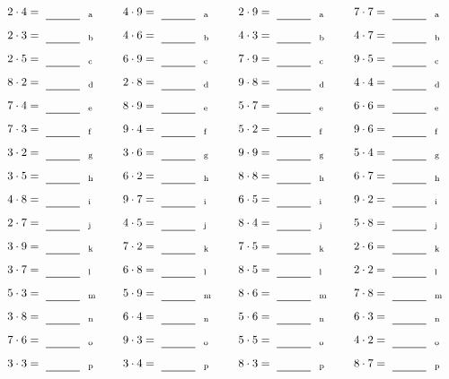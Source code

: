 \documentclass
[
  draft    = true,
  fontsize = 11pt,
  parskip  = half-
]
{scrartcl}
\begin{document}
\par\vfill\par
\begin{align*}
    \pline{2\cdot4}&=\rline{a}
  & \pline{4\cdot9}&=\rline{a}
  & \pline{2\cdot9}&=\rline{a}
  & \pline{7\cdot7}&=\rline{a} \\[1ex]
    \pline{2\cdot3}&=\rline{b}
  & \pline{4\cdot6}&=\rline{b}
  & \pline{4\cdot3}&=\rline{b}
  & \pline{4\cdot7}&=\rline{b} \\[1ex]
    \pline{2\cdot5}&=\rline{c}
  & \pline{6\cdot9}&=\rline{c}
  & \pline{7\cdot9}&=\rline{c}
  & \pline{9\cdot5}&=\rline{c} \\[1ex]
    \pline{8\cdot2}&=\rline{d}
  & \pline{2\cdot8}&=\rline{d}
  & \pline{9\cdot8}&=\rline{d}
  & \pline{4\cdot4}&=\rline{d} \\[1ex]
    \pline{7\cdot4}&=\rline{e}
  & \pline{8\cdot9}&=\rline{e}
  & \pline{5\cdot7}&=\rline{e}
  & \pline{6\cdot6}&=\rline{e} \\[1ex]
    \pline{7\cdot3}&=\rline{f}
  & \pline{9\cdot4}&=\rline{f}
  & \pline{5\cdot2}&=\rline{f}
  & \pline{9\cdot6}&=\rline{f} \\[1ex]
    \pline{3\cdot2}&=\rline{g}
  & \pline{3\cdot6}&=\rline{g}
  & \pline{9\cdot9}&=\rline{g}
  & \pline{5\cdot4}&=\rline{g} \\[1ex]
    \pline{3\cdot5}&=\rline{h}
  & \pline{6\cdot2}&=\rline{h}
  & \pline{8\cdot8}&=\rline{h}
  & \pline{6\cdot7}&=\rline{h} \\[1ex]
    \pline{4\cdot8}&=\rline{i}
  & \pline{9\cdot7}&=\rline{i}
  & \pline{6\cdot5}&=\rline{i}
  & \pline{9\cdot2}&=\rline{i} \\[1ex]
    \pline{2\cdot7}&=\rline{j}
  & \pline{4\cdot5}&=\rline{j}
  & \pline{8\cdot4}&=\rline{j}
  & \pline{5\cdot8}&=\rline{j} \\[1ex]
    \pline{3\cdot9}&=\rline{k}
  & \pline{7\cdot2}&=\rline{k}
  & \pline{7\cdot5}&=\rline{k}
  & \pline{2\cdot6}&=\rline{k} \\[1ex]
    \pline{3\cdot7}&=\rline{l}
  & \pline{6\cdot8}&=\rline{l}
  & \pline{8\cdot5}&=\rline{l}
  & \pline{2\cdot2}&=\rline{l} \\[1ex]
    \pline{5\cdot3}&=\rline{m}
  & \pline{5\cdot9}&=\rline{m}
  & \pline{8\cdot6}&=\rline{m}
  & \pline{7\cdot8}&=\rline{m} \\[1ex]
    \pline{3\cdot8}&=\rline{n}
  & \pline{6\cdot4}&=\rline{n}
  & \pline{5\cdot6}&=\rline{n}
  & \pline{6\cdot3}&=\rline{n} \\[1ex]
    \pline{7\cdot6}&=\rline{o}
  & \pline{9\cdot3}&=\rline{o}
  & \pline{5\cdot5}&=\rline{o}
  & \pline{4\cdot2}&=\rline{o} \\[1ex]
    \pline{3\cdot3}&=\rline{p}
  & \pline{3\cdot4}&=\rline{p}
  & \pline{8\cdot3}&=\rline{p}
  & \pline{8\cdot7}&=\rline{p}
\end{align*}
\end{document}
